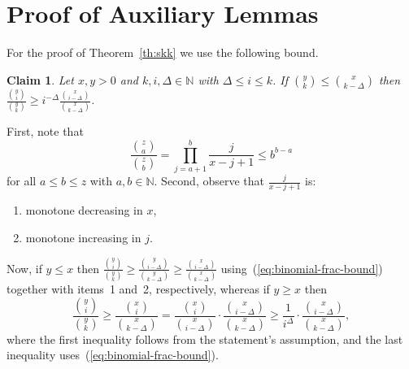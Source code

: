 \documentclass[11pt]{article}
\makeatletter
\renewenvironment{proof}[1][\proofname]
{\par\pushQED{\qed}
	\normalfont\topsep6\p@\@plus6\p@\relax\trivlist
	\item[\hskip\labelsep\bfseries#1\@addpunct{.}]
	\ignorespaces}
{\popQED\endtrivlist\@endpefalse}
\newtheorem{claim}[theo]{Claim}
\newcommand{\D}{\Delta}
\newcommand{\N}{\mathbb{N}}
\makeatother
\begin{document}
\appendix
%

\section{Proof of Auxiliary Lemmas}\label{sec:aux}

For the proof of Theorem~\ref{th:skk} we use the following bound.

\begin{claim}\label{claim:binom-ratio}
	Let $x,y>0$ and $k,i,\Delta \in \N$ with $\D \le i \le k$.
	If $\binom{y}{k} \le \binom{x}{k-\D}$ then $\frac{\binom{y}{i}}{\binom{y}{k}} \ge i^{-\D} \frac{\binom{x}{i-\D}}{\binom{x}{k-\D}}$.
\end{claim}
\begin{proof}
	First, note that
	\begin{equation}\label{eq:binomial-frac-bound}
	\frac{\binom{z}{a}}{\binom{z}{b}} = 
	\prod_{j=a+1}^{b} \frac{j}{x-j+1} 
	\le b^{b-a}
	\end{equation}
	for all $a \le b \le z$ with $a,b \in \N$. 
	Second, observe that $\frac{j}{x-j+1}$ is:
	\begin{enumerate}
		\item monotone decreasing in $x$,
		\item monotone increasing in $j$.
	\end{enumerate}
	Now, if $y \le x$ then $\frac{\binom{y}{i}}{\binom{y}{k}} \ge \frac{\binom{y}{i-\D}}{\binom{y}{k-\D}} \ge \frac{\binom{x}{i-\D}}{\binom{x}{k-\D}}$ using~(\ref{eq:binomial-frac-bound}) together with items~1 and~2, respectively,
	whereas if $y \ge x$ then
	$$\frac{\binom{y}{i}}{\binom{y}{k}} 
	\ge \frac{\binom{x}{i}}{\binom{x}{k-\D}} 
	= \frac{\binom{x}{i}}{\binom{x}{i-\D}} \cdot \frac{\binom{x}{i-\D}}{\binom{x}{k-\D}}
	\ge \frac{1}{i^{\D}}\cdot \frac{\binom{x}{i-\D}}{\binom{x}{k-\D}},$$
	where the first inequality follows from the statement's assumption,
	and the last inequality uses~(\ref{eq:binomial-frac-bound}).
\end{proof}
\end{document}
